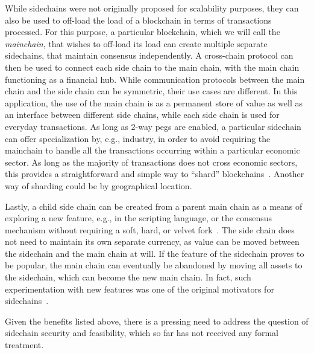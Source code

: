 While sidechains were not originally proposed for scalability purposes, they can
also be used to off-load the load of a blockchain in terms of transactions
processed. For this purpose, a particular blockchain, which we will call the
\emph{mainchain}, that wishes to off-load its load can create multiple separate
sidechains, that maintain consensus independently. A
cross-chain protocol can then be used to connect each side chain to the main
chain, with the main chain functioning as a financial hub. While communication
protocols between the main chain and the side chain can be symmetric, their use
cases are different. In this application, the use of the main chain is as a
permanent store of value as well as an interface between different side chains,
while each side chain is used for everyday transactions. As long as 2-way pegs
are enabled, a particular sidechain can offer specialization by, e.g., industry,
in order to avoid requiring the mainchain to handle all the transactions
occurring within a particular economic sector. As long as the majority of
transactions does not cross economic sectors, this provides a straightforward
and simple way to ``shard'' blockchains~\cite{sharding,omniledger,rapidchain}.
Another way of sharding could be by geographical location.

Lastly, a child side chain can be created from a parent main chain as a means of
exploring a new feature, e.g., in the scripting language, or the consensus
mechanism without requiring a soft, hard, or velvet fork~\cite{nipopows,velvet}.
The side chain does not need to maintain its own separate currency, as value can
be moved between the sidechain and the main chain at will. If the feature of the
sidechain proves to be popular, the main chain can eventually be abandoned by
moving all assets to the sidechain, which can become the new main chain. In
fact, such experimentation with new features was one of the original motivators
for sidechains~\cite{sidechains}.

Given the benefits listed above, there is a pressing need to address the
question of sidechain security and feasibility, which so far has not received
any formal treatment.

